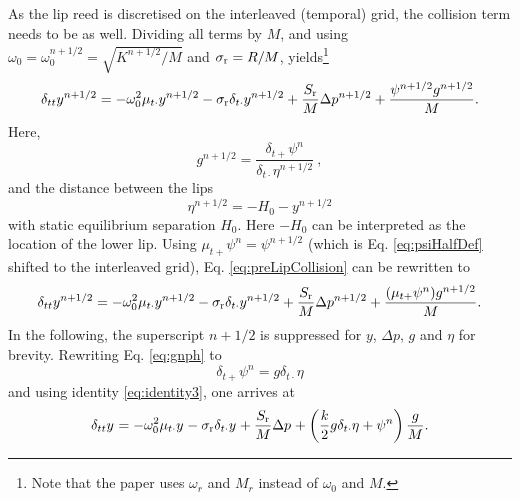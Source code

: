 As the lip reed is discretised on the interleaved (temporal) grid, the collision term needs to be as well. Dividing all terms by $M$, and using $\omega_0 = \omega_0^{n+1/2} = \sqrt{K^{n+1/2}/M}$ and $\sigma_{\text{r}} = R/M$, yields\footnote{Note that the paper uses $\omega_r$ and $M_r$ instead of $\omega_0$ and $M$.}
\begin{equation}\label{eq:preLipCollision}
    \delta_{tt}y^{n+1/2} = -\omega_0^2\mu_{t\cdot}y^{n+1/2}-\sigma_\text{r}\delta_{t\cdot}y^{n+1/2} + \frac{S_\text{r}}{M}\Delta p^{n+1/2} + \frac{\psi^{n+1/2}g^{n+1/2}}{M}.
\end{equation}
Here,
\begin{equation}\label{eq:gnph}
    g^{n+1/2} = \frac{\delta_{t+}\psi^n}{\delta_{t\cdot}\eta^{n+1/2}}\ ,
\end{equation}
and the distance between the lips
\begin{equation}\label{eq:etaBarrier}
    \eta^{n+1/2} = -H_0 - y^{n+1/2}
\end{equation}
with static equilibrium separation $H_0$. Here $-H_0$ can be interpreted as the location of the lower lip.
Using $\mu_{t+}\psi^n = \psi^{n+1/2}$ (which is Eq. \eqref{eq:psiHalfDef} shifted to the interleaved grid), Eq. \eqref{eq:preLipCollision} can be rewritten to
\begin{equation*}
    \delta_{tt}y^{n+1/2} = -\omega_0^2\mu_{t\cdot}y^{n+1/2}-\sigma_\text{r}\delta_{t\cdot}y^{n+1/2} + \frac{S_\text{r}}{M}\Delta p^{n+1/2} + \frac{(\mu_{t+}\psi^n)g^{n+1/2}}{M}.
\end{equation*}
In the following, the superscript $n+1/2$ is suppressed for $y$, $\Delta p$, $g$ and $\eta$ for brevity. Rewriting Eq. \eqref{eq:gnph} to
\begin{equation}\label{eq:rewrittenPsi}
    \delta_{t+}\psi^n = g\delta_{t\cdot}\eta
\end{equation}
and using identity \eqref{eq:identity3}, one arrives at
\begin{equation}\label{eq:lipReedFDSCollision}
    \delta_{tt}y^{} = -\omega_0^2\mu_{t\cdot}y^{}-\sigma_\text{r}\delta_{t\cdot}y^{} + \frac{S_\text{r}}{M}\Delta p^{} + \left(\frac{k}{2}g\delta_{t\cdot}\eta + \psi^n\right)\frac{g}{M}.
\end{equation}
